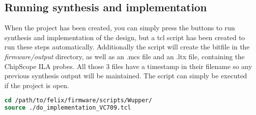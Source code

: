 \subsection{Running synthesis and implementation}
When the project has been created, you can simply press the buttons to run synthesis and implementation of the design, but a tcl script has been created to run these steps automatically. Additionally the script will create the bitfile in the \textit{firmware/output} directory, as well as an .mcs file and an .ltx file, containing the ChipScope ILA probes. All those 3 files have a timestamp in their filename so any previous synthesis output will be maintained.
The script can simply be executed if the project is open. 
\begin{lstlisting}[frame=single, language=tcl, caption=start synthesis / implementation]
cd /path/to/felix/firmware/scripts/Wupper/
source ./do_implementation_VC709.tcl
\end{lstlisting}
\newpage


